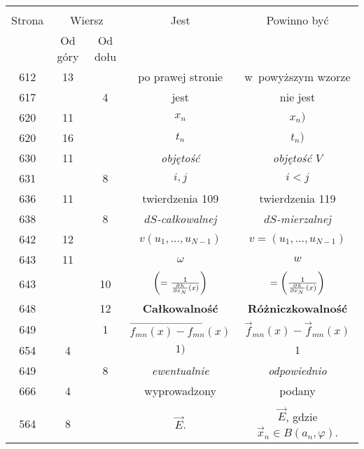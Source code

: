 \documentclass[a4paper,11pt]{article}
\begin{document}
\begin{center}

  \begin{tabular}{|c|c|c|c|c|}
    \hline
    & \multicolumn{2}{c|}{} & & \\
    Strona & \multicolumn{2}{c|}{Wiersz} & Jest
                              & Powinno być \\ \cline{2-3}
    & Od góry & Od dołu & & \\
    \hline
    612 & 13 & & po prawej stronie & w~powyższym wzorze \\
    617 & &  4 & jest & nie jest \\
    620 & 11 & & $x_{ n }$ & $x_{ n } )$ \\
    620 & 16 & & $t_{ n }$ & $t_{ n } )$ \\
    630 & 11 & & \textit{objętość} & \textit{objętość $V$} \\
    631 & &  8 & $i, j$ & $i < j$ \\
    636 & 11 & & twierdzenia 109 & twierdzenia 119 \\
    638 & &  8 & \textit{$dS$-całkowalnej} & \textit{$dS$-mierzalnej} \\
    642 & 12 & & $v( u_{ 1 }, \ldots, u_{ N - 1 } )$
           & $v = ( u_{ 1 }, \ldots, u_{ N - 1 } )$ \\
    643 & 11 & & $\omega$ & $w$ \\
    643 & & 10 & $\left( = \frac{ 1 }{
                 \frac{ \partial^{  } {  h  } }{ \partial {  { x_{ N } }  }^{  } }( x ) } \right)$
           & $= \left( \frac{ 1 }{
             \frac{ \partial^{  } {  h  } }{ \partial {  { x_{ N } }  }^{  } }( x ) } \right)$ \\
    648 & & 12 & \textbf{Całkowalność}
           & \textbf{Różniczkowalność} \\
    649 & &  1 & $\overrightarrow{ f_{ m n }( x ) - f_{ m n }( x ) }$
           & $\vec{ f }_{ m n }( x ) - \vec{ f }_{ m n }( x )$ \\
    654 &  4 & & $1 )$ & $1$ \\
    649 & &  8 & \textit{ewentualnie} & \textit{odpowiednio} \\
    666 &  4 & & wyprowadzony & podany \\
    & & & & \\
    564 &  8 & & $\vec{ E }$.
           & $\vec{ E }$, gdzie $\vec{ x }_{ n } \in B( a_{ n }, \varphi )$. \\
    \hline
  \end{tabular}

\end{center}
\end{document}
